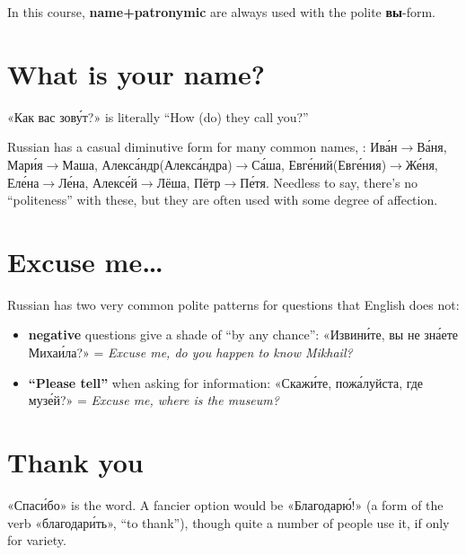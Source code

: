 In this course, \textbf{name+patronymic} are always used with the polite
\textbf{вы}-form.

\section{What is your name?}\label{what-is-your-name}

«Как вас зов\'{у}т?» is literally ``How (do) they call you?''

Russian has a casual diminutive form for many common names, : Ив\'{а}н$ \rightarrow$В\'{а}ня,
Мар\'{и}я$ \rightarrow$Маша, Алекс\'{а}ндр(Алекс\'{а}ндра)$ \rightarrow$С\'{а}ша, Евг\'{е}ний(Евг\'{е}ния)$ \rightarrow$Ж\'{е}ня,
Ел\'{е}на$ \rightarrow$Л\'{е}на, Алекс\'{е}й$ \rightarrow$Лёша, Пётр$ \rightarrow$П\'{е}тя. Needless to say, there's no
``politeness'' with these, but they are often used with some degree of
affection.

\section{Excuse me\ldots{}}\label{excuse-me}

Russian has two very common polite patterns for questions that English
does not:

\begin{itemize}
\tightlist
\item
  \textbf{negative} questions give a shade of ``by any chance'':
  «Извин\'{и}те, вы не зн\'{а}ете Миха\'{и}ла?» = \emph{Excuse me, do you happen to
  know Mikhail?}
\item
  \textbf{``Please tell''} when asking for information: «Скаж\'{и}те,
  пож\'{а}луйста, где муз\'{е}й?» = \emph{Excuse me, where is the museum?}
\end{itemize}

\section{Thank you}\label{thank-you}

«Спас\'{и}бо» is the word. A fancier option would be «Благодар\'{ю}!» (a form of
the verb «благодар\'{и}ть», ``to thank''), though quite a number of people
use it, if only for variety.
